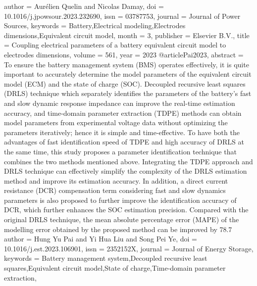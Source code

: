 {{{{{{{{   author = {Aurélien Quelin and Nicolas Damay},
   doi = {10.1016/j.jpowsour.2023.232690},
   issn = {03787753},
   journal = {Journal of Power Sources},
   keywords = {Battery,Electrical modeling,Electrodes dimensions,Equivalent circuit model},
   month = {3},
   publisher = {Elsevier B.V.},
   title = {Coupling electrical parameters of a battery equivalent circuit model to electrodes dimensions},
   volume = {561},
   year = {2023}
}
@article{Pai2023,
   abstract = {To ensure the battery management system (BMS) operates effectively, it is quite important to accurately determine the model parameters of the equivalent circuit model (ECM) and the state of charge (SOC). Decoupled recursive least squares (DRLS) technique which separately identifies the parameters of the battery's fast and slow dynamic response impedance can improve the real-time estimation accuracy, and time-domain parameter extraction (TDPE) methods can obtain model parameters from experimental voltage data without optimizing the parameters iteratively; hence it is simple and time-effective. To have both the advantages of fast identification speed of TDPE and high accuracy of DRLS at the same time, this study proposes a parameter identification technique that combines the two methods mentioned above. Integrating the TDPE approach and DRLS technique can effectively simplify the complexity of the DRLS estimation method and improve its estimation accuracy. In addition, a direct current resistance (DCR) compensation term considering fast and slow dynamics parameters is also proposed to further improve the identification accuracy of DCR, which further enhances the SOC estimation precision. Compared with the original DRLS technique, the mean absolute percentage error (MAPE) of the modelling error obtained by the proposed method can be improved by 78.7 %
   author = {Hung Yu Pai and Yi Hua Liu and Song Pei Ye},
   doi = {10.1016/j.est.2023.106901},
   issn = {2352152X},
   journal = {Journal of Energy Storage},
   keywords = {Battery management system,Decoupled recursive least squares,Equivalent circuit model,State of charge,Time-domain parameter extraction},
}}}}}}}}}
